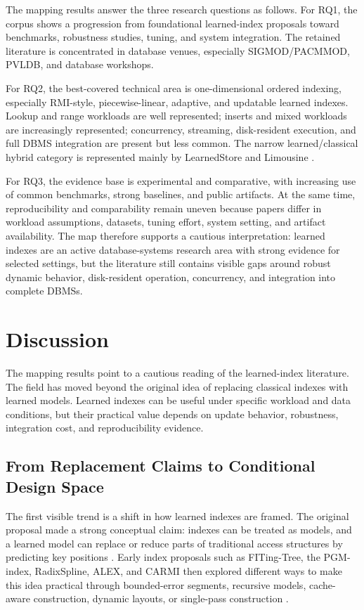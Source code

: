 \documentclass[a4paper, 12pt, twoside]{report}
\begin{document}
The mapping results answer the three research questions as follows. For RQ1, the corpus shows a progression from foundational learned-index proposals toward benchmarks, robustness studies, tuning, and system integration. The retained literature is concentrated in database venues, especially SIGMOD/PACMMOD, PVLDB, and database workshops.

For RQ2, the best-covered technical area is one-dimensional ordered indexing, especially RMI-style, piecewise-linear, adaptive, and updatable learned indexes. Lookup and range workloads are well represented; inserts and mixed workloads are increasingly represented; concurrency, streaming, disk-resident execution, and full DBMS integration are present but less common. The narrow learned/classical hybrid category is represented mainly by LearnedStore and Limousine \cite{maharjan2023learnedstore,chatterjee2024limousine}.

For RQ3, the evidence base is experimental and comparative, with increasing use of common benchmarks, strong baselines, and public artifacts. At the same time, reproducibility and comparability remain uneven because papers differ in workload assumptions, datasets, tuning effort, system setting, and artifact availability. The map therefore supports a cautious interpretation: learned indexes are an active database-systems research area with strong evidence for selected settings, but the literature still contains visible gaps around robust dynamic behavior, disk-resident operation, concurrency, and integration into complete DBMSs.

\chapter{Discussion}

The mapping results point to a cautious reading of the learned-index literature. The field has moved beyond the original idea of replacing classical indexes with learned models. Learned indexes can be useful under specific workload and data conditions, but their practical value depends on update behavior, robustness, integration cost, and reproducibility evidence.

\section{From Replacement Claims to Conditional Design Space}

The first visible trend is a shift in how learned indexes are framed. The original proposal made a strong conceptual claim: indexes can be treated as models, and a learned model can replace or reduce parts of traditional access structures by predicting key positions \cite{kraska2018}. Early index proposals such as FITing-Tree, the PGM-index, RadixSpline, ALEX, and CARMI then explored different ways to make this idea practical through bounded-error segments, recursive models, cache-aware construction, dynamic layouts, or single-pass construction \cite{galakatos2019fiting,ferragina2020pgm,kipf2020radixspline,ding2020alex,zhang2022carmi}.
\end{document}
